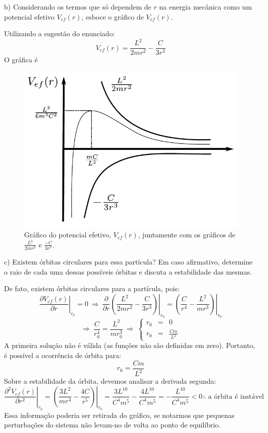 \begin{enumerate}[start=1,label={\bfseries Q\arabic*.}]
b) Considerando os termos que só dependem de $r$ na energia mecânica como um potencial efetivo $V_{ef}(r)$, esboce o gráfico de $V_{ef}(r)$.

\resposta Utilizando a sugestão do enunciado:
$$
V_{ef}(r) = \frac{L^{2}}{2mr^{2}} - \frac{C}{3r^{3}}
$$
O gráfica é
\begin{figure}[H]
  \centering
  \includegraphics[scale=0.7]{classica-img/potencial.pdf}
  \caption{Gráfico do potencial efetivo, $V_{ef}(r)$, juntamente com os gráficos de $\frac{L^{2}}{2mr^{2}}$ e $\frac{-C}{3r^{3}}$.}
\end{figure}

c) Existem órbitas circulares para essa partícula? Em caso afirmativo, determine o raio de cada uma dessas possíveis órbitas e discuta a estabilidade das mesmas.

\resposta De fato, existem órbitas circulares para a partícula, pois:
$$
\left. \frac{\partial V_{ef}(r)}{\partial r} \right|_{r_{0}} = 0 \ \Rightarrow \ \left. \frac{\partial}{\partial r} \left( \frac{L^{2}}{2mr^{2}} - \frac{C}{3r^{3}} \right) \right|_{r_{0}} = \left. \left( \frac{C}{r^{4}} - \frac{L^{2}}{mr^{3}} \right) \right|_{r_{0}}
$$
$$
\Rightarrow \ \frac{C}{r_{0}^{4}} = \frac{L^{2}}{mr_{0}^{3}} \ \Rightarrow \ \left\{ \begin{array}{ccc}
                                           r_{0} & = & 0 \\
                                           r_{0} & = & \frac{Cm}{L^{2}}
                                         \end{array} \right.
$$
A primeira solução não é válida (as funções não são definidas em zero). Portanto, é possível a ocorrência de órbita para:
$$
r_{0} = \frac{Cm}{L^{2}}
$$
Sobre a estabilidade da órbita, devemos analisar a derivada segunda:
$$
\left. \frac{\partial^{2} V_{ef}(r)}{\partial r^{2}} \right|_{r_{0}} = \left. \left( \frac{3L^{2}}{mr^{4}} - \frac{4C}{r^{5}} \right) \right|_{r_{0}} = \frac{3L^{10}}{C^{4} m^{5}} - \frac{4L^{10}}{C^{4}m^{5}} = - \frac{L^{10}}{C^{4}m^{5}} < 0 \therefore \mbox{ a órbita é instável}
$$
Essa informação poderia ser retirada do gráfico, se notarmos que pequenas perturbações do sistema não levam-no de volta ao ponto de equilíbrio.



\end{enumerate}
